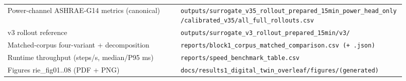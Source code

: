 \documentclass[11pt,a4paper]{article}
\begin{document}
\begin{longtable}{@{}p{0.40\linewidth} p{0.52\linewidth}@{}}
Power-channel ASHRAE-G14 metrics (canonical) & \texttt{outputs/\allowbreak surrogate\_\allowbreak v35\_\allowbreak rollout\_\allowbreak prepared\_\allowbreak 15min\_\allowbreak power\_\allowbreak head\_\allowbreak only/\allowbreak calibrated\_\allowbreak v35/\allowbreak all\_\allowbreak full\_\allowbreak rollouts.csv} \\
v3 rollout reference & \texttt{outputs/\allowbreak surrogate\_\allowbreak v3\_\allowbreak rollout\_\allowbreak prepared\_\allowbreak 15min/\allowbreak v3/\allowbreak } \\
Matched-corpus four-variant + decomposition & \texttt{reports/\allowbreak block1\_\allowbreak corpus\_\allowbreak matched\_\allowbreak comparison.csv (+ .json)} \\
Runtime throughput (steps/s, median/P95 ms) & \texttt{reports/\allowbreak speed\_\allowbreak benchmark\_\allowbreak table.csv} \\
Figures rie\_fig01..08 (PDF + PNG) & \texttt{docs/\allowbreak results1\_\allowbreak digital\_\allowbreak twin\_\allowbreak overleaf/\allowbreak figures/\allowbreak   (generated)} \\
\bottomrule
\end{longtable}
\normalsize
\end{document}
